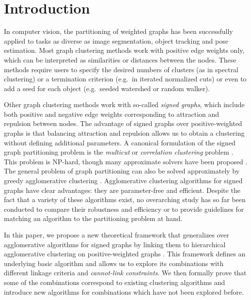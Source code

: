 
\section{Introduction}
In computer vision, the partitioning of weighted graphs has been successfully applied to tasks as diverse as image segmentation, object tracking and pose estimation. 
Most graph clustering methods work with positive edge weights only, which can be interpreted as similarities or distances between the nodes. These methods require users to specify the desired numbers of clusters (as in spectral clustering) or a termination criterion (e.g.\ in iterated normalized cuts) or even to add a seed for each object  (e.g.\ seeded watershed or random walker).  

Other graph clustering methods work with so-called \emph{signed graphs}, which include both positive and negative edge weights corresponding to attraction and repulsion between nodes. The advantage of signed graphs over positive-weighted graphs is that balancing attraction and repulsion allows us to obtain a clustering without defining additional parameters. A canonical formulation of the signed graph partitioning problem is the \emph{multicut} or \emph{correlation clustering} problem \cite{kappes2011globally,chopra1991multiway}. This problem is NP-hard, though many approximate solvers have been proposed \cite{lange2018combinatorial,pape2017solving,beier2016efficient,yarkony2012fast}. The general problem of graph partitioning can also be solved approximately by greedy agglomerative clustering \cite{keuper2015efficient,levinkov2017comparative,wolf2018mutex,kardoostsolving}. 
Agglomerative clustering algorithms for signed graphs have clear advantages: they are parameter-free and efficient. Despite the fact that a variety of these algorithms exist, no overarching study has so far been conducted to compare their robustness and efficiency or to provide guidelines for matching an algorithm to the partitioning problem at hand. 


In this paper, we propose a new theoretical framework that generalizes over agglomerative algorithms for signed graphs by linking them to hierarchical agglomerative clustering on positive-weighted graphs \cite{lance1967general}. This framework defines an underlying basic algorithm and allows us to explore its combinations with different linkage criteria and \emph{cannot-link constraints}. 
We then formally prove that some of the combinations correspond to existing clustering algorithms and introduce new algorithms for combinations which have not been explored before.

